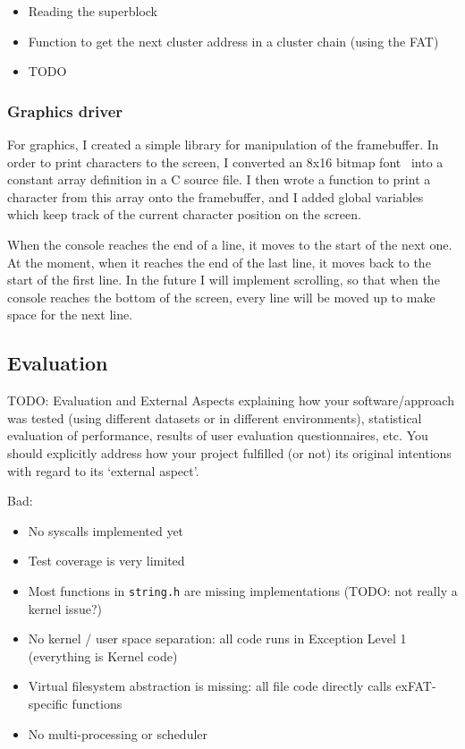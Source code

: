 \documentclass{article}
\begin{document}
\begin{itemize}
    \item Reading the superblock
    \item Function to get the next cluster address in a cluster chain (using
        the FAT)
    \item TODO
\end{itemize}

\subsubsection{Graphics driver}
\label{sec:impl_graphics}
For graphics, I created a simple library for manipulation of the framebuffer.
In order to print characters to the screen, I converted an 8x16 bitmap
font~\cite{bizcat-font} into a constant array definition in a C source file. I
then wrote a function to print a character from this array onto the
framebuffer, and I added global variables which keep track of the current
character position on the screen.

When the console reaches the end of a line, it moves to the start of the next
one. At the moment, when it reaches the end of the last line, it moves back to
the start of the first line. In the future I will implement scrolling, so that
when the console reaches the bottom of the screen, every line will be moved up
to make space for the next line.


\subsection{Evaluation}
TODO: Evaluation and External Aspects explaining how your software/approach was
tested (using different datasets or in different environments), statistical
evaluation of performance, results of user evaluation questionnaires, etc. You
should explicitly address how your project fulfilled (or not) its original
intentions with regard to its `external aspect'.

Bad:
\begin{itemize}
    \item No syscalls implemented yet
    \item Test coverage is very limited
    \item Most functions in \texttt{string.h} are missing implementations
        (TODO: not really a kernel issue?)
    \item No kernel / user space separation: all code runs in Exception Level 1
        (everything is Kernel code)
    \item Virtual filesystem abstraction is missing: all file code directly
        calls exFAT-specific functions
    \item No multi-processing or scheduler
\end{itemize}
\end{document}
